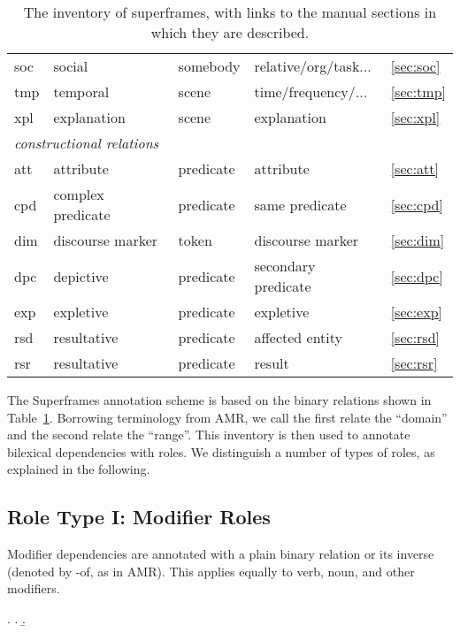 \documentclass[a4paper]{article}
\begin{document}
\begin{table}
\begin{tabular}{lllll}
        soc & social & somebody & relative/org/task... & \ref{sec:soc} \\
        tmp & temporal & scene & time/frequency/... & \ref{sec:tmp} \\
        xpl & explanation & scene & explanation & \ref{sec:xpl} \\
        \midrule
        \multicolumn{4}{l}{\emph{constructional relations}} \\
        att & attribute & predicate & attribute & \ref{sec:att} \\
        cpd & complex predicate & predicate & same predicate & \ref{sec:cpd} \\
        dim & discourse marker & token & discourse marker & \ref{sec:dim} \\
        dpc & depictive & predicate & secondary predicate & \ref{sec:dpc}\\
        exp & expletive & predicate & expletive & \ref{sec:exp} \\
        rsd & resultative & predicate & affected entity & \ref{sec:rsd} \\
        rsr & resultative & predicate & result & \ref{sec:rsr} \\
        \bottomrule
    \end{tabular}
    \caption{The inventory of superframes, with links to the manual sections in which they are described.}
    \label{tab:inventory}
\end{table}

The Superframes annotation scheme is based on the binary relations shown in Table~\ref{tab:inventory}. Borrowing terminology from AMR, we call the first relate the ``domain'' and the second relate the ``range''. This inventory is then used to annotate bilexical dependencies with roles. We distinguish a number of types of roles, as explained in the following.


\subsection{Role Type I: Modifier Roles}

Modifier dependencies are annotated with a plain binary relation or its inverse (denoted by \textsf{-of}, as in AMR). This applies equally to verb, noun, and other modifiers.

\ex. \a. 
     \b. 
\end{document}
